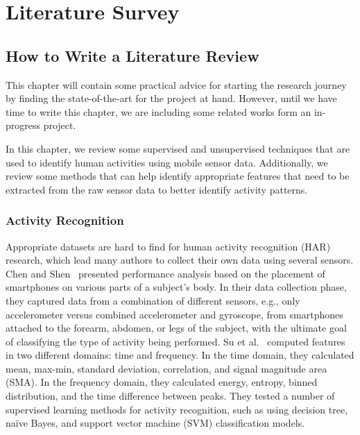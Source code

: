 \chapter{Literature Survey}\label{ch:literature_review}

\section{How to Write a Literature Review}\label{sec:literature_review:howto}

This chapter will contain some practical advice for starting the research journey by finding the state-of-the-art for the project at hand. However, until we have time to write this chapter, we are including some related works form an in-progress project.

In this chapter, we review some supervised and unsupervised techniques that are used to identify human activities using mobile sensor data. Additionally, we review some methods that can help identify appropriate features that need to be extracted from the raw sensor data to better identify activity patterns.

\subsection{Activity Recognition}
Appropriate datasets are hard to find for human activity recognition (HAR) research, which lead many authors to collect their own data using several sensors. Chen and Shen~\cite{chen2017} presented performance analysis based on the placement of smartphones on various parts of a subject's body. In their data collection phase, they captured data from a combination of different sensors, e.g., only accelerometer versus combined accelerometer and gyroscope, from smartphones attached to the forearm, abdomen, or legs of the subject, with the ultimate goal of classifying the type of activity being performed.
Su et al.~\cite{su2014} computed features in two different domains: time and frequency. In the time domain, they calculated mean, max-min, standard deviation, correlation, and signal magnitude area (SMA). In the frequency domain, they calculated energy, entropy, binned distribution, and the time difference between peaks. They tested a number of supervised learning methods for activity recognition, such as using decision tree, na\"{i}ve Bayes, and support vector machine (SVM) classification models. 

